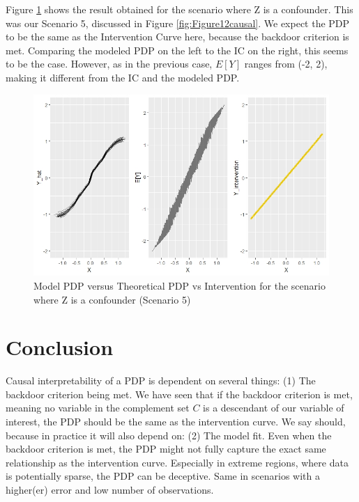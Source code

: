 \documentclass[
]{krantz}
\begin{document}
Figure \ref{fig:Figure14causal} shows the result obtained for the scenario where Z is a confounder. This was our Scenario 5, discussed in Figure \ref{fig:Figure12causal}. We expect the PDP to be the same as the Intervention Curve here, because the backdoor criterion is met. Comparing the modeled PDP on the left to the IC on the right, this seems to be the case. However, as in the previous case, \(E[Y]\) ranges from (-2, 2), making it different from the IC and the modeled PDP.

\begin{figure}

\includegraphics[width=1\linewidth]{images/theoretical_pdp2} \hfill{}

\caption{Model PDP versus Theoretical PDP vs Intervention for the scenario where Z is a confounder (Scenario 5)}\label{fig:Figure14causal}
\end{figure}

\hypertarget{conclusion}{%
\section{Conclusion}\label{conclusion}}

Causal interpretability of a PDP is dependent on several things:
(1) The backdoor criterion being met. We have seen that if the backdoor criterion is met, meaning no variable in the complement set \(C\) is a descendant of our variable of interest, the PDP should be the same as the intervention curve. We say should, because in practice it will also depend on:
(2) The model fit. Even when the backdoor criterion is met, the PDP might not fully capture the exact same relationship as the intervention curve. Especially in extreme regions, where data is potentially sparse, the PDP can be deceptive. Same in scenarios with a higher(er) error and low number of observations.
\end{document}
